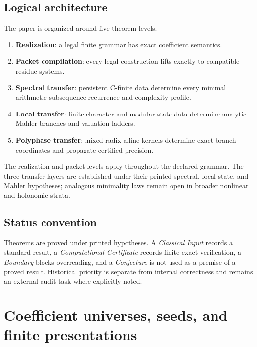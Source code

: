 \documentclass[11pt]{article}
\theoremstyle{definition}\newtheorem{definition}[theorem]{Definition}\newtheorem{example}[theorem]{Example}\newtheorem{construction}[theorem]{Construction}\newtheorem{algorithm}[theorem]{Algorithm}\newtheorem{conjecture}[theorem]{Conjecture}\newtheorem{problem}[theorem]{Problem}
\theoremstyle{remark}\newtheorem{remark}[theorem]{Remark}\newtheorem{boundary}[theorem]{Boundary}\newtheorem{certificate}[theorem]{Computational Certificate}\newtheorem{classical}[theorem]{Classical Input}\newtheorem{principle}[theorem]{Structural Principle}
\begin{document}
\subsection{Logical architecture}
The paper is organized around five theorem levels.
\begin{enumerate}
\item \textbf{Realization}: a legal finite grammar has exact coefficient semantics.
\item \textbf{Packet compilation}: every legal construction lifts exactly to compatible residue systems.
\item \textbf{Spectral transfer}: persistent C-finite data determine every minimal arithmetic-subsequence recurrence and complexity profile.
\item \textbf{Local transfer}: finite character and modular-state data determine analytic Mahler branches and valuation ladders.
\item \textbf{Polyphase transfer}: mixed-radix affine kernels determine exact branch coordinates and propagate certified precision.
\end{enumerate}
The realization and packet levels apply throughout the declared grammar. The three transfer layers are established under their printed spectral, local-state, and Mahler hypotheses; analogous minimality laws remain open in broader nonlinear and holonomic strata.

\subsection{Status convention}
Theorems are proved under printed hypotheses.  A \emph{Classical Input} records a standard result, a \emph{Computational Certificate} records finite exact verification, a \emph{Boundary} blocks overreading, and a \emph{Conjecture} is not used as a premise of a proved result.  Historical priority is separate from internal correctness and remains an external audit task where explicitly noted.


\section{Coefficient universes, seeds, and finite presentations}
\end{document}
